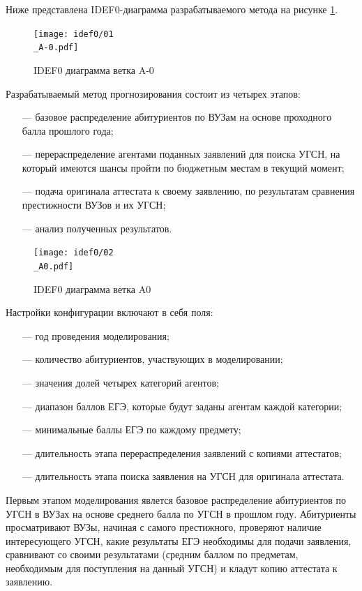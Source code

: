 Ниже представлена IDEF0-диаграмма разрабатываемого метода на рисунке  \ref{A-0}.

\begin{figure}[hbtp]
	\centering
	\texttt{[image: idef0/01\\\_A-0.pdf]}
	\caption{IDEF0 диаграмма ветка A-0}
	\label{A-0}
\end{figure}

Разрабатываемый метод прогнозирования состоит из четырех этапов:

\begin{itemize}[leftmargin=1.6\parindent]
	\item[---] базовое распределение абитуриентов по ВУЗам на основе проходного балла прошлого года;
	\item[---] перераспределение агентами поданных заявлений для поиска УГСН, на который имеются шансы пройти по бюджетным местам в текущий момент;
	\item[---] подача оригинала аттестата к своему заявлению, по результатам сравнения престижности ВУЗов и их УГСН;
	\item[---] анализ полученных результатов.
\end{itemize}

\begin{figure}[hbtp]
	\centering
	\texttt{[image: idef0/02\\\_A0.pdf]}
	\caption{IDEF0 диаграмма ветка A0}
	\label{A0}
\end{figure}

Настройки конфигурации включают в себя поля:

\begin{itemize}[leftmargin=1.6\parindent]
	\item[---] год проведения моделирования;
	\item[---] количество абитуриентов, участвующих в моделировании;
	\item[---] значения долей четырех категорий агентов;
	\item[---] диапазон баллов ЕГЭ, которые будут заданы агентам каждой категории;
	\item[---] минимальные баллы ЕГЭ по каждому предмету;
	\item[---] длительность этапа перераспределения заявлений с копиями аттестатов;
	\item[---] длительность этапа поиска заявления на УГСН для оригинала аттестата.

\end{itemize}

Первым этапом моделирования явлется базовое распределение абитуриентов по УГСН в ВУЗах на основе среднего балла по УГСН в прошлом году. Абитуриенты просматривают ВУЗы, начиная с самого престижного, проверяют наличие интересующего УГСН, какие результаты ЕГЭ необходимы для подачи заявления, сравнивают со своими результатами (средним баллом по предметам, необходимым для поступления на данный УГСН) и кладут копию аттестата к заявлению.

